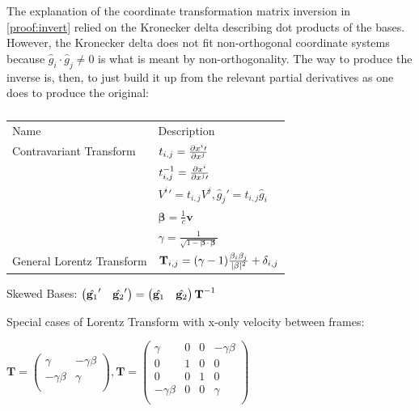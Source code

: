 \documentclass{article}
\begin{document}
The explanation of the coordinate transformation matrix inversion in \cref{proof:invert} relied on the Kronecker delta describing dot products of the bases. However, the Kronecker delta does not fit non-orthogonal coordinate systems because $\hat{g}_i \cdot \hat{g}_j \neq 0$ is what is meant by non-orthogonality. The way to produce the inverse is, then, to just build it up from the relevant partial derivatives as one does to produce the original:

\begin{table}
\begin{tabulary}{\textwidth}{|L|L|}
Name & Description \\
Contravariant Transform & $t_{i,j} = \frac{\partial{x^i\prime}}{\partial{x^j}} $ \\
& $t_{i,j}^{-1} = \frac{\partial{x^i}}{\partial{x^j\prime}} $ \\
& $V^{i}\prime = t_{i,j} V^j, \hat{g}_{j}\prime = t_{i,j} \hat{g}_i $ \\
\hline
\hline
 & $ {\bm \beta} = \frac{1}{c} \textbf{v}$ \\
\hline
 & $ \gamma = \frac{1}{\sqrt{1 - {\bm \beta} \cdot {\bm \beta}}} $\\
\hline
General Lorentz Transform & $ \textbf{T}_{i,j} = (\gamma - 1) \frac{ \beta_i \beta_j}{\lvert \beta \rvert^2 } + \delta_{i,j}$ \\ 
\hline
\end{tabulary}

Skewed Bases: $\begin{pmatrix} 
               \hat{\mathbf{g}_{1}}' & \hat{\mathbf{g}_{2}}' 
               \end{pmatrix} 
               = 
              \begin{pmatrix} 
              \hat{\mathbf{g}_{1}} & \hat{\mathbf{g}_{2}} 
              \end{pmatrix} \textbf{T}^{-1}$

Special cases of Lorentz Transform with x-only velocity between frames:

$\textbf{T} = \begin{pmatrix}
              \gamma & - \gamma \beta \\
              - \gamma \beta & \gamma \\
              \end{pmatrix} , 
\textbf{T} = \begin{pmatrix}
              \gamma & 0 & 0 & - \gamma \beta \\
              0 & 1 & 0 & 0 \\
              0 & 0 & 1 & 0 \\
              - \gamma \beta & 0 & 0 & \gamma \\
              \end{pmatrix} $
\caption{ }
\label{tab:non_orth}
\end{table}
\end{document}
